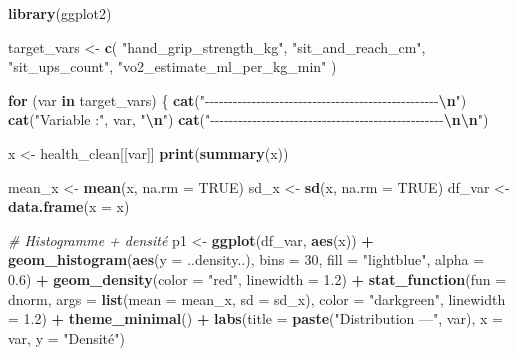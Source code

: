 \documentclass[
]{article}
\newenvironment{Shaded}{\begin{snugshade}}{\end{snugshade}}
\newcommand{\AttributeTok}[1]{\textcolor[rgb]{0.13,0.29,0.53}{#1}}
\newcommand{\CommentTok}[1]{\textcolor[rgb]{0.56,0.35,0.01}{\textit{#1}}}
\newcommand{\ConstantTok}[1]{\textcolor[rgb]{0.56,0.35,0.01}{#1}}
\newcommand{\ControlFlowTok}[1]{\textcolor[rgb]{0.13,0.29,0.53}{\textbf{#1}}}
\newcommand{\DecValTok}[1]{\textcolor[rgb]{0.00,0.00,0.81}{#1}}
\newcommand{\FloatTok}[1]{\textcolor[rgb]{0.00,0.00,0.81}{#1}}
\newcommand{\FunctionTok}[1]{\textcolor[rgb]{0.13,0.29,0.53}{\textbf{#1}}}
\newcommand{\NormalTok}[1]{#1}
\newcommand{\OtherTok}[1]{\textcolor[rgb]{0.56,0.35,0.01}{#1}}
\newcommand{\SpecialCharTok}[1]{\textcolor[rgb]{0.81,0.36,0.00}{\textbf{#1}}}
\newcommand{\StringTok}[1]{\textcolor[rgb]{0.31,0.60,0.02}{#1}}
\begin{document}
\begin{Shaded}
\begin{Highlighting}[]
\FunctionTok{library}\NormalTok{(ggplot2)}

\NormalTok{target\_vars }\OtherTok{\textless{}{-}} \FunctionTok{c}\NormalTok{(}
  \StringTok{"hand\_grip\_strength\_kg"}\NormalTok{,}
  \StringTok{"sit\_and\_reach\_cm"}\NormalTok{,}
  \StringTok{"sit\_ups\_count"}\NormalTok{,}
  \StringTok{"vo2\_estimate\_ml\_per\_kg\_min"}
\NormalTok{)}

\ControlFlowTok{for}\NormalTok{ (var }\ControlFlowTok{in}\NormalTok{ target\_vars) \{}
  \FunctionTok{cat}\NormalTok{(}\StringTok{"{-}{-}{-}{-}{-}{-}{-}{-}{-}{-}{-}{-}{-}{-}{-}{-}{-}{-}{-}{-}{-}{-}{-}{-}{-}{-}{-}{-}{-}{-}{-}{-}{-}{-}{-}{-}{-}{-}{-}{-}{-}{-}{-}{-}{-}{-}{-}{-}{-}{-}}\SpecialCharTok{\textbackslash{}n}\StringTok{"}\NormalTok{)}
  \FunctionTok{cat}\NormalTok{(}\StringTok{"Variable :"}\NormalTok{, var, }\StringTok{"}\SpecialCharTok{\textbackslash{}n}\StringTok{"}\NormalTok{)}
  \FunctionTok{cat}\NormalTok{(}\StringTok{"{-}{-}{-}{-}{-}{-}{-}{-}{-}{-}{-}{-}{-}{-}{-}{-}{-}{-}{-}{-}{-}{-}{-}{-}{-}{-}{-}{-}{-}{-}{-}{-}{-}{-}{-}{-}{-}{-}{-}{-}{-}{-}{-}{-}{-}{-}{-}{-}{-}{-}}\SpecialCharTok{\textbackslash{}n\textbackslash{}n}\StringTok{"}\NormalTok{)}

\NormalTok{  x }\OtherTok{\textless{}{-}}\NormalTok{ health\_clean[[var]]}
  \FunctionTok{print}\NormalTok{(}\FunctionTok{summary}\NormalTok{(x))}

\NormalTok{  mean\_x }\OtherTok{\textless{}{-}} \FunctionTok{mean}\NormalTok{(x, }\AttributeTok{na.rm =} \ConstantTok{TRUE}\NormalTok{)}
\NormalTok{  sd\_x   }\OtherTok{\textless{}{-}} \FunctionTok{sd}\NormalTok{(x, }\AttributeTok{na.rm =} \ConstantTok{TRUE}\NormalTok{)}
\NormalTok{  df\_var }\OtherTok{\textless{}{-}} \FunctionTok{data.frame}\NormalTok{(}\AttributeTok{x =}\NormalTok{ x)}

  \CommentTok{\# Histogramme + densité}
\NormalTok{  p1 }\OtherTok{\textless{}{-}} \FunctionTok{ggplot}\NormalTok{(df\_var, }\FunctionTok{aes}\NormalTok{(x)) }\SpecialCharTok{+}
    \FunctionTok{geom\_histogram}\NormalTok{(}\FunctionTok{aes}\NormalTok{(}\AttributeTok{y =}\NormalTok{ ..density..), }\AttributeTok{bins =} \DecValTok{30}\NormalTok{,}
                   \AttributeTok{fill =} \StringTok{"lightblue"}\NormalTok{, }\AttributeTok{alpha =} \FloatTok{0.6}\NormalTok{) }\SpecialCharTok{+}
    \FunctionTok{geom\_density}\NormalTok{(}\AttributeTok{color =} \StringTok{"red"}\NormalTok{, }\AttributeTok{linewidth =} \FloatTok{1.2}\NormalTok{) }\SpecialCharTok{+}
    \FunctionTok{stat\_function}\NormalTok{(}\AttributeTok{fun =}\NormalTok{ dnorm,}
                  \AttributeTok{args =} \FunctionTok{list}\NormalTok{(}\AttributeTok{mean =}\NormalTok{ mean\_x, }\AttributeTok{sd =}\NormalTok{ sd\_x),}
                  \AttributeTok{color =} \StringTok{"darkgreen"}\NormalTok{, }\AttributeTok{linewidth =} \FloatTok{1.2}\NormalTok{) }\SpecialCharTok{+}
    \FunctionTok{theme\_minimal}\NormalTok{() }\SpecialCharTok{+}
    \FunctionTok{labs}\NormalTok{(}\AttributeTok{title =} \FunctionTok{paste}\NormalTok{(}\StringTok{"Distribution —"}\NormalTok{, var), }\AttributeTok{x =}\NormalTok{ var, }\AttributeTok{y =} \StringTok{"Densité"}\NormalTok{)}


\end{Highlighting}
\end{Shaded}
\end{document}
